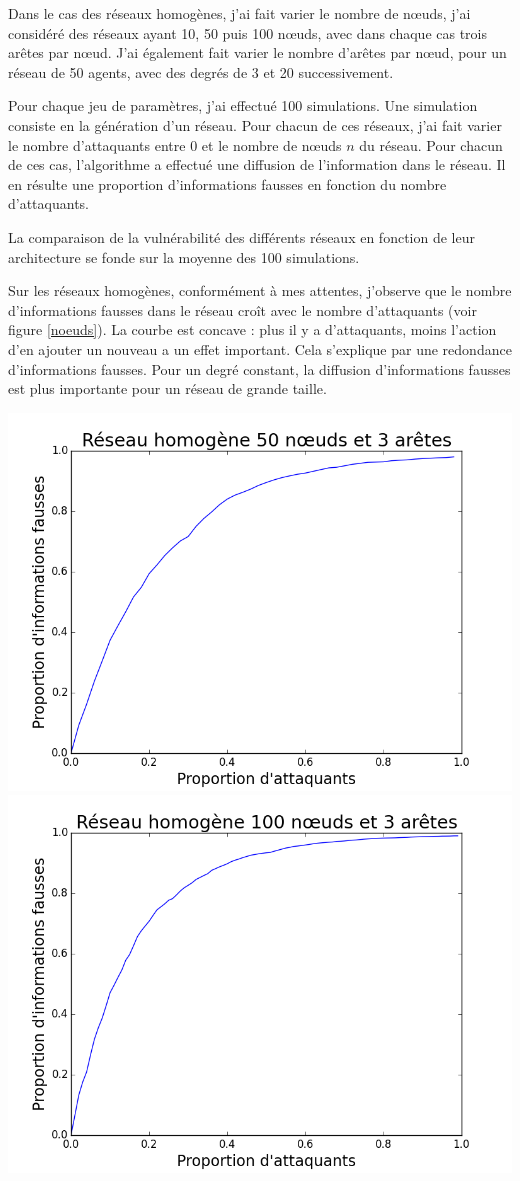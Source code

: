 \documentclass[12pt,a4paper]{article}
\begin{document}
Dans le cas des réseaux homogènes, j'ai fait varier le nombre de nœuds, j'ai considéré des réseaux ayant 10, 50 puis 100 nœuds, avec dans chaque cas trois arêtes par nœud.
J'ai également fait varier le nombre d'arêtes par nœud, pour un réseau de 50 agents, avec des degrés de 3 et 20 successivement.

Pour chaque jeu de paramètres, j'ai effectué 100 simulations.
Une simulation consiste en la génération d'un réseau.
Pour chacun de ces réseaux, j'ai fait varier le nombre d'attaquants entre 0 et le nombre de nœuds $n$ du réseau.
Pour chacun de ces cas, l'algorithme a effectué une diffusion de l'information dans le réseau.
Il en résulte une proportion d'informations fausses en fonction du nombre d'attaquants.

La comparaison de la vulnérabilité des différents réseaux en fonction de leur architecture se fonde sur la moyenne des 100 simulations. 


Sur les réseaux homogènes, conformément à mes attentes, j'observe que le nombre d'informations fausses dans le réseau croît avec le nombre d'attaquants (voir figure \ref{noeuds}).
La courbe est concave : plus il y a d’attaquants, moins l’action d’en ajouter un nouveau a un effet important.
Cela s'explique par une redondance d'informations fausses.
Pour un degré constant, la diffusion d'informations fausses est plus importante pour un réseau de grande taille.

\begin{center}
\includegraphics[width=0.49\linewidth]{../resultats/atkaleat/atkaleat-50-3-2-i100.png}
\includegraphics[width=0.49\linewidth]{../resultats/atkaleat/atkaleat-100-3-1-i100.png}
 \label{noeuds}
\end{center}
\end{document}
